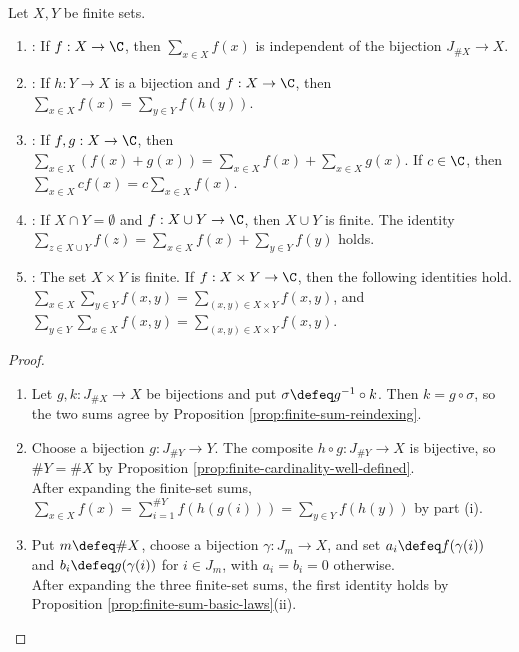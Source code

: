 \begin{proposition} \label{prop:finite-set-summation-laws} \\
Let $X,Y$ be finite sets.
\begin{enumerate}[label=(\roman*)]
\setlength{\itemsep}{0pt}
\item {}: If $f:X\to\C$, then $\sum\limits_{x\in X}f(x)$ is independent of the bijection $J_{\#X}\to X$.
\item {}: If $h:Y\to X$ is a bijection and $f:X\to\C$, then $\sum\limits_{x\in X}f(x)=\sum\limits_{y\in Y}f(h(y))$.
\item {}: If $f,g:X\to\C$, then $\sum\limits_{x\in X}(f(x)+g(x))=\sum\limits_{x\in X}f(x)+\sum\limits_{x\in X}g(x)$. If $c\in\C$, then $\sum\limits_{x\in X}cf(x)=c\sum\limits_{x\in X}f(x)$.
\item {}: If $X\cap Y=\emptyset$ and $f:X\cup Y\to\C$, then $X\cup Y$ is finite. The identity $\sum\limits_{z\in X\cup Y}f(z)=\sum\limits_{x\in X}f(x)+\sum\limits_{y\in Y}f(y)$ holds.
\item {}: The set $X\times Y$ is finite. If $f:X\times Y\to\C$, then the following identities hold.\\
$\sum\limits_{x\in X}\sum\limits_{y\in Y}f(x,y)=\sum\limits_{(x,y)\in X\times Y}f(x,y)$, and $\sum\limits_{y\in Y}\sum\limits_{x\in X}f(x,y)=\sum\limits_{(x,y)\in X\times Y}f(x,y)$.
\end{enumerate}
\begin{proof}
\begin{enumerate}[label=(\roman*)]
\setlength{\itemsep}{0pt}
\item Let $g,k:J_{\#X}\to X$ be bijections and put $\sigma\defeq g^{-1}\circ k$. Then $k=g\circ\sigma$, so the two sums agree by Proposition \ref{prop:finite-sum-reindexing}.
\item Choose a bijection $g:J_{\#Y}\to Y$. The composite $h\circ g:J_{\#Y}\to X$ is bijective, so $\#Y=\#X$ by Proposition \ref{prop:finite-cardinality-well-defined}.\\
After expanding the finite-set sums, $\sum\limits_{x\in X}f(x)=\sum\limits_{i=1}^{\#Y}f(h(g(i)))=\sum\limits_{y\in Y}f(h(y))$ by part (i).
\item Put $m\defeq\#X$, choose a bijection $\gamma:J_m\to X$, and set $a_i\defeq f(\gamma(i))$ and $b_i\defeq g(\gamma(i))$ for $i\in J_m$, with $a_i=b_i=0$ otherwise.\\
After expanding the three finite-set sums, the first identity holds by Proposition \ref{prop:finite-sum-basic-laws}(ii).\\

\end{enumerate}
\end{proof}
\end{proposition}
